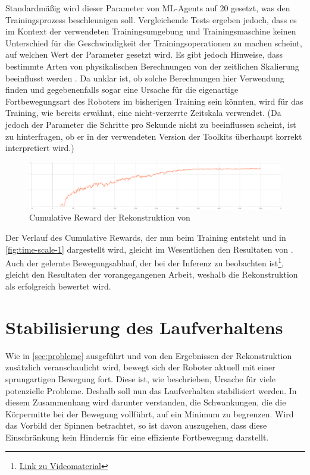 Standardmäßig wird dieser Parameter von ML-Agents auf 20 gesetzt, was den Trainingsprozess beschleunigen soll.
Vergleichende Tests ergeben jedoch, dass es im Kontext der verwendeten Trainingsumgebung und Trainingsmaschine keinen Unterschied für die Geschwindigkeit der Trainingsoperationen zu machen scheint, auf welchen Wert der Parameter gesetzt wird.
Es gibt jedoch Hinweise, dass bestimmte Arten von physikalischen Berechnungen von der zeitlichen Skalierung beeinflusst werden \cite{zhang2021}.
Da unklar ist, ob solche Berechnungen hier Verwendung finden und gegebenenfalls sogar eine Ursache für die eigenartige Fortbewegungsart des Roboters im bisherigen Training sein könnten, wird für das Training, wie bereits erwähnt, eine nicht-verzerrte Zeitskala verwendet.
(Da jedoch der Parameter die Schritte pro Sekunde nicht zu beeinflussen scheint, ist zu hinterfragen, ob er in der verwendeten Version der Toolkits überhaupt korrekt interpretiert wird.)

\begin{figure}[H]
    \centering
    \includegraphics[width=\textwidth]{Bilder/ml-agents/Environment_Cumulative Reward_time-scale-1.pdf}
    \caption{Cumulative Reward der Rekonstruktion von \cite{waidner.2020}}
    \label{fig:time-scale-1}
\end{figure}

Der Verlauf des Cumulative Rewards, der nun beim Training entsteht und in \autoref{fig:time-scale-1} dargestellt wird, gleicht im Wesentlichen den Resultaten von \cite[50]{waidner.2020}.
Auch der gelernte Bewegungsablauf, der bei der Inferenz zu beobachten ist\footnote{\href{https://github.com/yschiebelhut/studienarbeit-doc/raw/master/Videos/SpiderBotDemos/timeScale1.webm}{Link zu Videomaterial}}, gleicht den Resultaten der vorangegangenen Arbeit, weshalb die Rekonstruktion als erfolgreich bewertet wird.


\section{Stabilisierung des Laufverhaltens}
Wie in \autoref{sec:probleme} ausgeführt und von den Ergebnissen der Rekonstruktion zusätzlich veranschaulicht wird, bewegt sich der Roboter aktuell mit einer sprungartigen Bewegung fort.
Diese ist, wie beschrieben, Ursache für viele potenzielle Probleme.
Deshalb soll nun das Laufverhalten stabilisiert werden.
In diesem Zusammenhang wird darunter verstanden, die Schwankungen, die die Körpermitte bei der Bewegung vollführt, auf ein Minimum zu begrenzen.
Wird das Vorbild der Spinnen betrachtet, so ist davon auszugehen, dass diese Einschränkung kein Hindernis für eine effiziente Fortbewegung darstellt.

